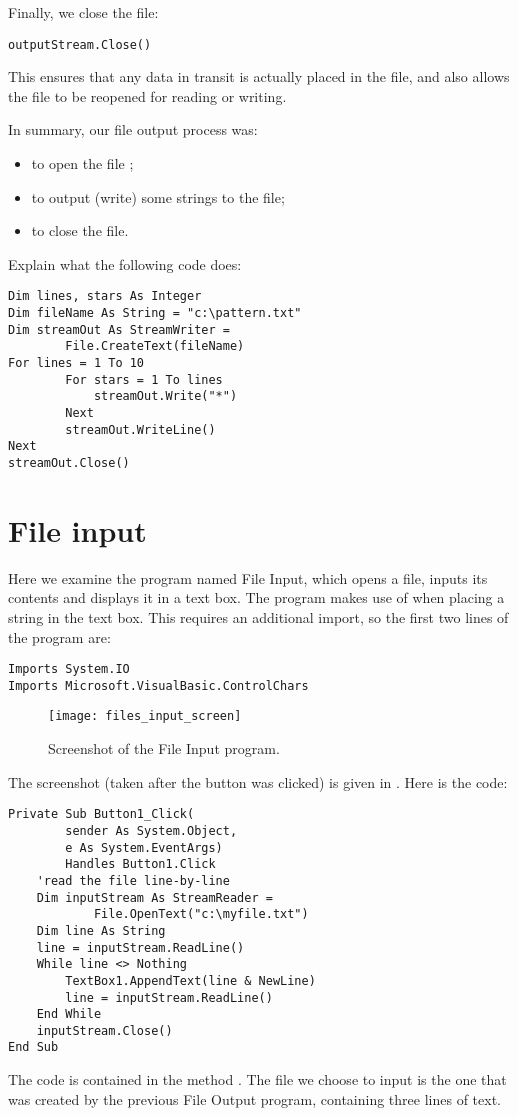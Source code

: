 		Finally, we close the file:
		\begin{lstlisting}
outputStream.Close()
		\end{lstlisting}
		This ensures that any data in transit is actually placed in the file, and also allows the file to be reopened for reading or writing.

		In summary, our file output process was:
		\begin{itemize}
      \item to open the file ;
      \item to output (write) some strings to the file;
      \item to close the file.
		\end{itemize}


		\begin{stqb}
			\begin{STQ}
				\item	Explain what the following code does:
					\begin{lstlisting}
Dim lines, stars As Integer
Dim fileName As String = "c:\pattern.txt"
Dim streamOut As StreamWriter =
		File.CreateText(fileName)
For lines = 1 To 10
		For stars = 1 To lines
			streamOut.Write("*")
		Next
		streamOut.WriteLine()
Next
streamOut.Close()
					\end{lstlisting}
			\end{STQ}
		\end{stqb}

	\section{File input}
		Here we examine the program named File Input, which opens a file, inputs its contents and displays it in a text box. The program makes use of  when placing a string in the text box. This requires an additional import, so the first two lines of the program are:
		\begin{lstlisting}
Imports System.IO
Imports Microsoft.VisualBasic.ControlChars
		\end{lstlisting}
		\begin{figure}[tbh]
			\centering
			\texttt{[image: files\_input\_screen]}
			\caption{Screenshot of the File Input program.}
			\label{fig:files_input_screen}
		\end{figure}
		The screenshot (taken after the button was clicked) is given in . Here is the code:
		\begin{lstlisting}
Private Sub Button1_Click(
		sender As System.Object,
		e As System.EventArgs)
		Handles Button1.Click
	'read the file line-by-line
	Dim inputStream As StreamReader =
			File.OpenText("c:\myfile.txt")
	Dim line As String
	line = inputStream.ReadLine()
	While line <> Nothing
		TextBox1.AppendText(line & NewLine)
		line = inputStream.ReadLine()
	End While
	inputStream.Close()
End Sub
		\end{lstlisting}
		The code is contained in the method . The file we choose to input is the one that was created by the previous File Output program, containing three lines of text.

